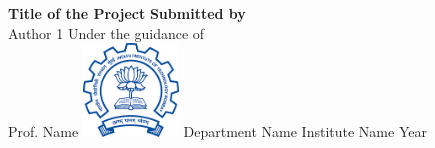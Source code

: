 \documentclass{article}
\begin{document}
	\begin{titlepage}
        \begin{center}
            \huge
            \textbf{Title of the Project}
            \vfill
            \Large
            \textbf{Submitted by} \\
            \medskip
            Author 1
            \vfill
            Under the guidance of \\
            \medskip
            Prof. Name
            \vfill
            \includegraphics[width=1in]{iit}
            \vfill
            Department Name
            \vfill
            Institute Name
            \vfill
            Year
        \end{center}
    \end{titlepage}

	\lipsum[1-10]
\end{document}
